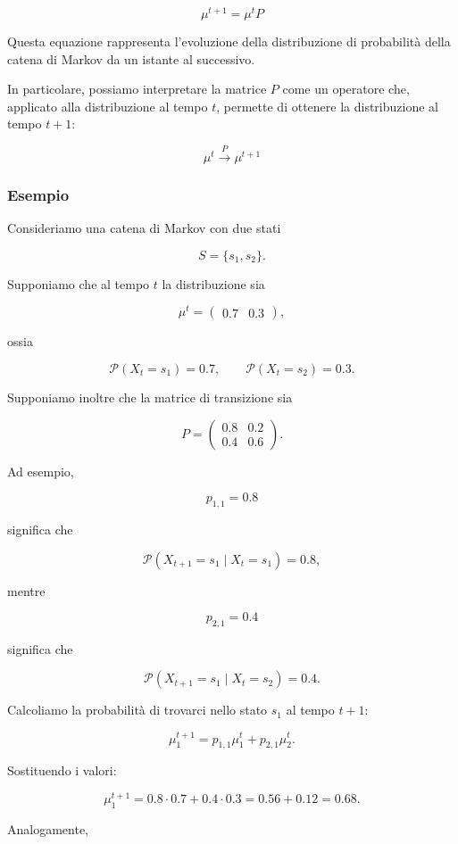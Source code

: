 \[
\boxed{
\mu^{t+1}=\mu^tP
}
\]

Questa equazione rappresenta l'evoluzione della distribuzione di probabilità della catena di Markov da un istante al successivo.

In particolare, possiamo interpretare la matrice $P$ come un operatore che, applicato alla distribuzione al tempo $t$, permette di ottenere la distribuzione al tempo $t+1$:

\[
\boxed{
\mu^t
\overset{P}{\longrightarrow}
\mu^{t+1}
}
\]

\subsubsection{Esempio}

Consideriamo una catena di Markov con due stati

\[
S=\{s_1,s_2\}.
\]

Supponiamo che al tempo $t$ la distribuzione sia

\[
\mu^t=
\begin{pmatrix}
0.7 & 0.3
\end{pmatrix},
\]

ossia

\[
\mathcal{P}(X_t=s_1)=0.7,
\qquad
\mathcal{P}(X_t=s_2)=0.3.
\]

Supponiamo inoltre che la matrice di transizione sia

\[
P=
\begin{pmatrix}
0.8 & 0.2\\
0.4 & 0.6
\end{pmatrix}.
\]

Ad esempio,

\[
p_{1,1}=0.8
\]

significa che

\[
\mathcal{P}(X_{t+1}=s_1\mid X_t=s_1)=0.8,
\]

mentre

\[
p_{2,1}=0.4
\]

significa che

\[
\mathcal{P}(X_{t+1}=s_1\mid X_t=s_2)=0.4.
\]

Calcoliamo la probabilità di trovarci nello stato $s_1$ al tempo $t+1$:

\[
\mu_1^{t+1}
=
p_{1,1}\mu_1^t+p_{2,1}\mu_2^t.
\]

Sostituendo i valori:

\[
\mu_1^{t+1}
=
0.8\cdot0.7+0.4\cdot0.3
=
0.56+0.12
=
0.68.
\]

Analogamente,

